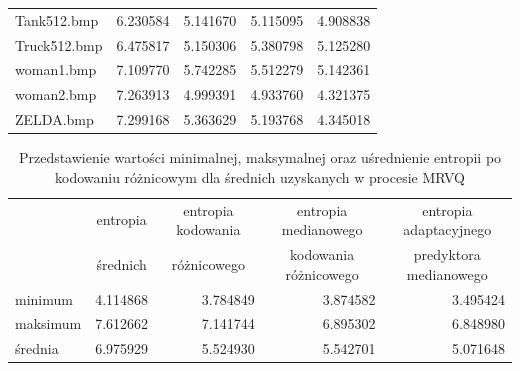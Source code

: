 \documentclass{article}
\begin{document}
\begin{table}[H]
\begin{tabular}{lrrrr}
    Tank512.bmp        & 6.230584                     & 5.141670                               & 5.115095                                  & 4.908838                                   \\
    Truck512.bmp       & 6.475817                     & 5.150306                               & 5.380798                                  & 5.125280                                   \\
    woman1.bmp         & 7.109770                     & 5.742285                               & 5.512279                                  & 5.142361                                   \\
    woman2.bmp         & 7.263913                     & 4.999391                               & 4.933760                                  & 4.321375                                   \\
    ZELDA.bmp          & 7.299168                     & 5.363629                               & 5.193768                                  & 4.345018                                   \\
    \bottomrule
  \end{tabular}
\end{table}

\begin{table}[H]
  \caption{Przedstawienie wartości minimalnej, maksymalnej oraz uśrednienie entropii po kodowaniu różnicowym dla średnich uzyskanych w procesie MRVQ}
  \label{tab:differential_encoding_summary}
  \centering
  \begin{tabular}{lrrrr}
    \toprule
    {}       & \multicolumn{1}{c}{entropia} & \multicolumn{1}{c}{entropia kodowania} & \multicolumn{1}{c}{entropia medianowego}  & \multicolumn{1}{c}{entropia adaptacyjnego} \\
    {}       & \multicolumn{1}{c}{średnich} & \multicolumn{1}{c}{różnicowego}        & \multicolumn{1}{c}{kodowania różnicowego} & \multicolumn{1}{c}{predyktora medianowego} \\
    \midrule
    minimum  & 4.114868                     & 3.784849                               & 3.874582                                  & 3.495424                                   \\
    maksimum & 7.612662                     & 7.141744                               & 6.895302                                  & 6.848980                                   \\
    średnia  & 6.975929                     & 5.524930                               & 5.542701                                  & 5.071648                                   \\
    \bottomrule
  \end{tabular}
\end{table}
\end{document}
